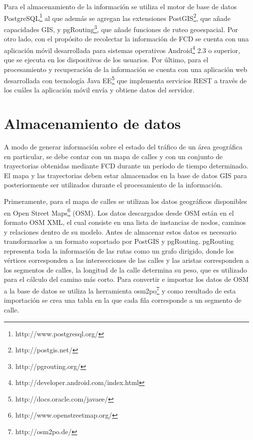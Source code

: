 Para el almacenamiento de la información se utiliza el motor de base de datos PostgreSQL\footnote{http://www.postgresql.org/} al que además se agregan las extensiones PostGIS\footnote{http://postgis.net/}, que añade capacidades GIS, y pgRouting\footnote{http://pgrouting.org/}, que añade funciones de ruteo geoespacial. Por otro lado, con el propósito de recolectar la información de FCD se cuenta con una aplicación móvil desarrollada para sistemas operativos Android\footnote{http://developer.android.com/index.html} 2.3 o superior, que se ejecuta en los dispositivos de los usuarios. Por último, para el procesamiento y recuperación de la información se cuenta con una aplicación web desarrollada con tecnología Java EE\footnote{http://docs.oracle.com/javaee/} que implementa servicios REST a través de los cuáles la aplicación móvil envía y obtiene datos del servidor.

\section{Almacenamiento de datos}
\label{base-de-datos}

A modo de generar información sobre el estado del tráfico de un área geográfica en particular, se debe contar con un mapa de calles y con un conjunto de trayectorias obtenidas mediante FCD durante un período de tiempo determinado. El mapa y las trayectorias deben estar almacenados en la base de datos GIS para posteriormente ser utilizados durante el procesamiento de la información.

Primeramente, para el mapa de calles se utilizan los datos geográficos disponibles en Open Street Maps\footnote{http://www.openstreetmap.org/} (OSM). Los datos descargados desde OSM están en el formato OSM XML, el cual consiste en una lista de instancias de nodos, caminos y relaciones dentro de su modelo. Antes de almacenar estos datos es necesario transformarlos a un formato soportado por PostGIS y pgRouting. pgRouting representa toda la información de las rutas como un grafo dirigido, donde los vértices corresponden a las intersecciones de las calles y las aristas corresponden a los segmentos de calles, la longitud de la calle determina su peso, que es utilizado para el cálculo del camino más corto. Para convertir e importar los datos de OSM a la base de datos se utiliza la herramienta osm2po\footnote{http://osm2po.de/} y como resultado de esta importación se crea una tabla en la que cada fila corresponde a un segmento de calle. 

